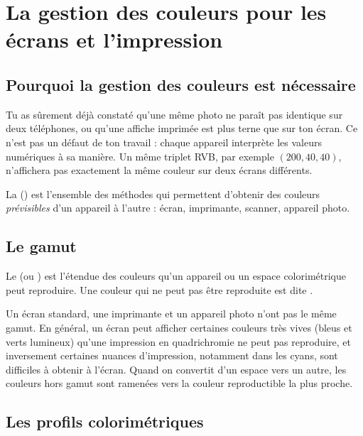 \section{La gestion des couleurs pour les écrans et l'impression}

\subsection{Pourquoi la gestion des couleurs est nécessaire}

Tu as sûrement déjà constaté qu'une même photo ne paraît pas identique sur deux téléphones, ou qu'une affiche imprimée est plus terne que sur ton écran. Ce n'est pas un défaut de ton travail : chaque appareil interprète les valeurs numériques à sa manière. Un même triplet RVB, par exemple $(200, 40, 40)$, n'affichera pas exactement la même couleur sur deux écrans différents.

La  () est l'ensemble des méthodes qui permettent d'obtenir des couleurs \emph{prévisibles} d'un appareil à l'autre : écran, imprimante, scanner, appareil photo.

\subsection{Le gamut}

\begin{defbox}[Le gamut]
Le  (ou ) est l'étendue des couleurs qu'un appareil ou un espace colorimétrique peut reproduire. Une couleur qui ne peut pas être reproduite est dite .
\end{defbox}

Un écran standard, une imprimante et un appareil photo n'ont pas le même gamut. En général, un écran peut afficher certaines couleurs très vives (bleus et verts lumineux) qu'une impression en quadrichromie ne peut pas reproduire, et inversement certaines nuances d'impression, notamment dans les cyans, sont difficiles à obtenir à l'écran. Quand on convertit d'un espace vers un autre, les couleurs hors gamut sont ramenées vers la couleur reproductible la plus proche.

\subsection{Les profils colorimétriques}

